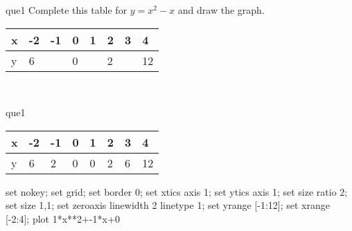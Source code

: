 \documentclass[13.5pt, varwidth=true]{beamer}
\begin{document}
\begin{frame}[shrink=19,fragile]
	\begin{beamercolorbox}[rounded=true, left, shadow=true,wd=14.8cm]{que1}
		 Complete this table for $y = x^{2} - x$ and draw the graph. \\[0.3cm] \renewcommand{\arraystretch}{1.2}\begin{tabular}{|C|C|C|C|C|C|C|C|} \hline x & -2 & -1 & 0 & 1 & 2 & 3 & 4 \\ \hline y & 6 &  & 0 &  & 2 &  & 12\\ \hline \end{tabular}\\[0.3cm]
	\end{beamercolorbox}
\end{frame}
\begin{frame}[shrink=19,fragile]
	\begin{beamercolorbox}[rounded=true, left, shadow=true,wd=14.8cm]{que1}
		\renewcommand{\arraystretch}{1.2}\begin{tabular}{|C|C|C|C|C|C|C|C|} \hline x & -2 & -1 & 0 & 1 & 2 & 3 & 4 \\ \hline y & 6 & 2 & 0 & 0 & 2 & 6 & 12\\ \hline \end{tabular}\begin{gnuplot}[terminal=pdf] set nokey; set grid; set border 0; set xtics axis 1; set ytics axis 1; set size ratio 2; set size 1,1; set zeroaxis linewidth 2 linetype 1; set yrange [-1:12]; set xrange [-2:4]; plot 1*x**2+-1*x+0 \end{gnuplot}
	\end{beamercolorbox}
\end{frame}
\end{document}

